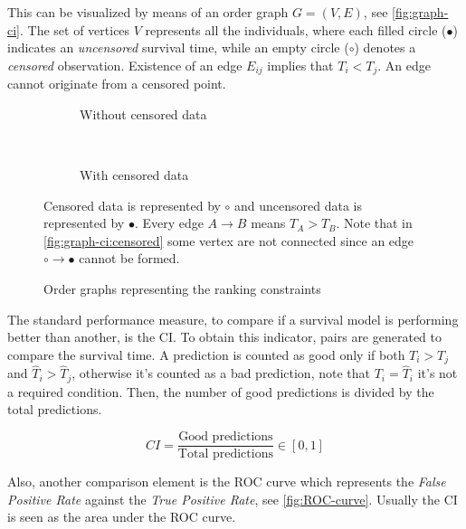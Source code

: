 This can be visualized by means of an order graph \( G = (V, E) \), see \autoref{fig:graph-ci}.
The set of vertices \( V \) represents all the individuals, where each filled circle 
(\( \bullet \)) indicates an \emph{uncensored} survival time, while an empty circle 
(\( \circ \)) denotes a \emph{censored} observation.
Existence of an edge \( E_{ij} \) implies that \( T_i < T_j \). An edge cannot originate 
from a censored point.

\begin{figure}
  \centering
  \begin{subfigure}[b]{.4\textwidth}
    \centering
    
    \caption{Without censored data}
  \end{subfigure}
  ~
  \begin{subfigure}[b]{.4\textwidth}
    \centering
    
    \caption{With censored data}
    \label{fig:graph-ci:censored}
  \end{subfigure}

  \caption{Order graphs representing the ranking constraints \label{fig:graph-ci}}

  Censored data is represented by \( \circ \) and uncensored data is represented by \( \bullet \).
  Every edge \( A \rightarrow B \) means \( T_A > T_B \). Note that in 
  \autoref{fig:graph-ci:censored} some vertex are not connected since an edge 
  \( \circ \rightarrow \bullet \) cannot be formed.
\end{figure}

The standard performance measure, to compare if a survival 
model is performing better than another, is the \gls{CI}. To obtain this 
indicator, pairs are generated to compare the survival time. A prediction is counted as good only
if both \( T_i > T_j \) and \( \hat{T}_i > \hat{T}_j \), otherwise
it's counted as a bad prediction, note that \( T_i = \hat{T}_i \) it's not a required condition. 
Then, the number of good predictions is divided by the total predictions. 
~\cite{medical:ranking-ci}

\[
  CI = \frac{\text{Good predictions}}{\text{Total predictions}} \in [0, 1]
\]

Also, another comparison 
element is the \gls{ROC} curve which represents the \emph{False Positive Rate} against the 
\emph{True Positive Rate}, see \autoref{fig:ROC-curve}. Usually the \gls{CI} is seen as 
the area under the \gls{ROC} curve.
~\cite{neural:roc-precision-recall}


